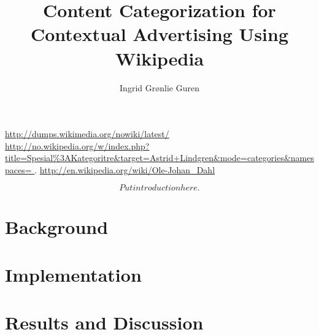\documentclass[a4paper,english]{book}
\title{Content Categorization for Contextual Advertising Using Wikipedia}
\author{Ingrid Grønlie Guren}
\begin{document}

\ififorside
\frontmatter{}
\maketitle{}


\urldef\nowikidump\url{http://dumps.wikimedia.org/nowiki/latest/}
\urldef\categorytree\url{http://no.wikipedia.org/w/index.php?title=Spesial%3AKategoritre&target=Astrid+Lindgren&mode=categories&namespaces= }.
\urldef\olejohandahleng\url{http://en.wikipedia.org/wiki/Ole-Johan_Dahl}



  
\tableofcontents{}
\listoffigures{}
\listoftables{}

\mainmatter{}



\[ Put introduction here. \]
\part{Background}





\part{Implementation}

\part{Results and Discussion}




\end{document}
